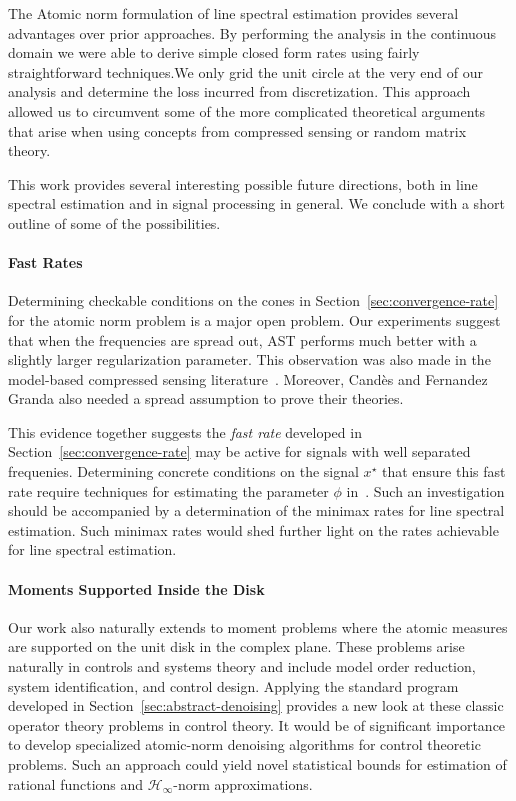 The Atomic norm formulation of line spectral estimation provides several
advantages over prior approaches. By performing the
analysis in the continuous domain we were able to derive simple closed form
rates using fairly straightforward techniques.We only grid the unit circle at the very end of
our analysis and determine the loss incurred from discretization. This approach
allowed us to circumvent some of the more complicated theoretical arguments
that arise when using concepts from compressed sensing or random matrix theory.

This work provides several interesting possible future directions, both in line
spectral estimation and in signal processing in general. We conclude with a
short outline of some of the possibilities.

\paragraph{Fast Rates} Determining checkable conditions on the cones in
Section~\ref{sec:convergence-rate} for the atomic norm problem is a major open
problem. Our experiments suggest that when the frequencies are spread out, AST
performs much better with a slightly larger regularization parameter.  This observation was also made in the model-based compressed sensing literature~\cite{duartescs}.  Moreover, Cand\`es and Fernandez Granda also needed a spread assumption to prove their theories.

This evidence together suggests the \emph{fast rate} developed in Section~\ref{sec:convergence-rate} may be active for signals with well separated frequenies. Determining concrete conditions on the signal $x^\star$ that ensure this fast rate require techniques for estimating the parameter $\phi$ in~. Such an
investigation should be accompanied by a determination of the minimax rates for
line spectral estimation. Such minimax rates would shed further light on the
rates achievable for line spectral estimation.

\paragraph{Moments Supported Inside the Disk} Our work also naturally extends
to moment problems where the atomic measures are supported on the unit disk in
the complex plane. These problems arise naturally in controls and systems
theory and include model order reduction, system identification, and control
design. Applying the standard program developed in
Section~\ref{sec:abstract-denoising} provides a new look at these classic
operator theory problems in control theory. It would be of significant
importance to develop specialized atomic-norm denoising algorithms for control
theoretic problems. Such an approach could yield novel statistical bounds for
estimation of rational functions and $\mathcal{H}_\infty$-norm approximations.

